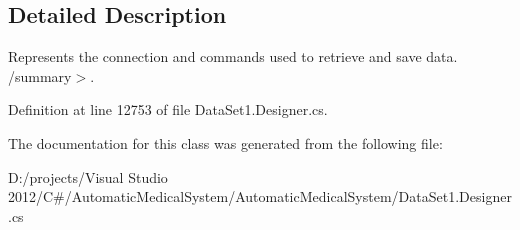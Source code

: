 \subsection{Detailed Description}
Represents the connection and commands used to retrieve and save data. /summary$>$. 

Definition at line 12753 of file DataSet1.Designer.cs.

The documentation for this class was generated from the following file:\begin{CompactItemize}
\item 
D:/projects/Visual Studio 2012/C\#/AutomaticMedicalSystem/AutomaticMedicalSystem/DataSet1.Designer.cs\end{CompactItemize}
